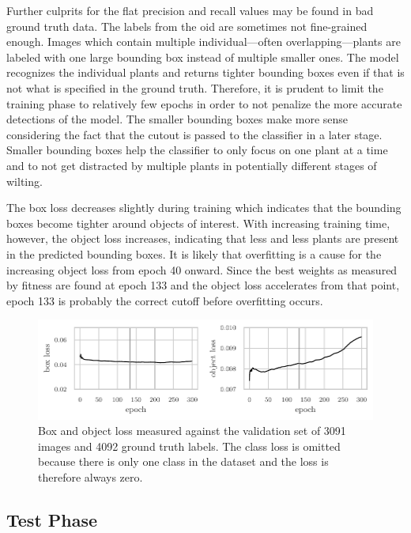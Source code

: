 \documentclass[draft,final]{vutinfth} %
\begin{document}
Further culprits for the flat precision and recall values may be found
in bad ground truth data. The labels from the \gls{oid} are sometimes not
fine-grained enough. Images which contain multiple individual—often
overlapping—plants are labeled with one large bounding box instead of
multiple smaller ones. The model recognizes the individual plants and
returns tighter bounding boxes even if that is not what is specified
in the ground truth. Therefore, it is prudent to limit the training
phase to relatively few epochs in order to not penalize the more
accurate detections of the model. The smaller bounding boxes make more
sense considering the fact that the cutout is passed to the classifier
in a later stage. Smaller bounding boxes help the classifier to only
focus on one plant at a time and to not get distracted by multiple
plants in potentially different stages of wilting.

The box loss decreases slightly during training which indicates that
the bounding boxes become tighter around objects of interest. With
increasing training time, however, the object loss increases,
indicating that less and less plants are present in the predicted
bounding boxes. It is likely that overfitting is a cause for the
increasing object loss from epoch 40 onward. Since the best weights as
measured by fitness are found at epoch 133 and the object loss
accelerates from that point, epoch 133 is probably the correct cutoff
before overfitting occurs.

\begin{figure}
  \centering
  \includegraphics{graphics/val_box_obj_loss.pdf}
  \caption[Object detection box and object loss.]{Box and object loss
    measured against the validation set of 3091 images and 4092 ground
    truth labels. The class loss is omitted because there is only one
    class in the dataset and the loss is therefore always zero.}
  \label{fig:box-obj-loss}
\end{figure}

\subsection{Test Phase}
\label{ssec:yolo-test}
\end{document}
